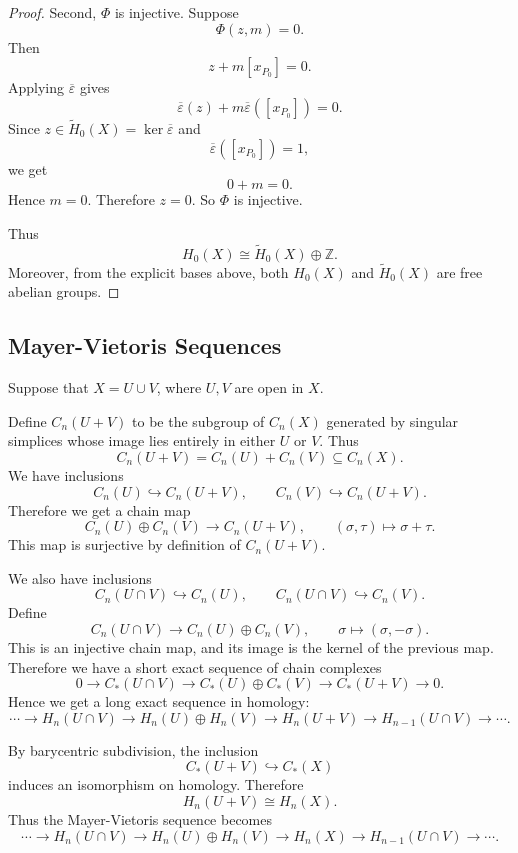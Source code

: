 \documentclass[11pt,a4paper]{article}
\theoremstyle{definition}
\theoremstyle{plain}
\theoremstyle{remark}
\newcommand{\1}{\mathbbm{1}}
\begin{document}
\begin{proof}
Second, $\Phi$ is injective. Suppose
\[
\Phi(z,m)=0.
\]
Then
\[
z+m[x_{P_0}]=0.
\]
Applying $\overline{\varepsilon}$ gives
\[
\overline{\varepsilon}(z)+m\overline{\varepsilon}([x_{P_0}])=0.
\]
Since $z\in \widetilde H_0(X)=\ker\overline{\varepsilon}$ and
\[
\overline{\varepsilon}([x_{P_0}])=1,
\]
we get
\[
0+m=0.
\]
Hence $m=0$. Therefore $z=0$. So $\Phi$ is injective.

Thus
\[
H_0(X)\cong \widetilde H_0(X)\oplus \mathbb Z.
\]
Moreover, from the explicit bases above, both $H_0(X)$ and $\widetilde H_0(X)$ are free
abelian groups.
\end{proof}

\subsection{Mayer-Vietoris Sequences}

Suppose that $X = U \cup V$, where $U,V$ are open in $X$.

Define $C_n(U+V)$ to be the subgroup of $C_n(X)$ generated by singular simplices whose image lies entirely in either $U$ or $V$. Thus
\[
    C_n(U+V)
    =
    C_n(U) + C_n(V)
    \subseteq C_n(X).
\]
We have inclusions
\[
    C_n(U) \hookrightarrow C_n(U+V),
    \qquad
    C_n(V) \hookrightarrow C_n(U+V).
\]
Therefore we get a chain map
\[
    C_n(U)\oplus C_n(V) \to C_n(U+V),
    \qquad
    (\sigma,\tau) \mapsto \sigma+\tau.
\]
This map is surjective by definition of $C_n(U+V)$.

We also have inclusions
\[
    C_n(U\cap V) \hookrightarrow C_n(U),
    \qquad
    C_n(U\cap V) \hookrightarrow C_n(V).
\]
Define
\[
    C_n(U\cap V) \to C_n(U)\oplus C_n(V),
    \qquad
    \sigma \mapsto (\sigma,-\sigma).
\]
This is an injective chain map, and its image is the kernel of the previous map. Therefore we have a short exact sequence of chain complexes
\[
    0
    \to
    C_*(U\cap V)
    \to
    C_*(U)\oplus C_*(V)
    \to
    C_*(U+V)
    \to
    0.
\]
Hence we get a long exact sequence in homology:
\[
    \cdots
    \to
    H_n(U\cap V)
    \to
    H_n(U)\oplus H_n(V)
    \to
    H_n(U+V)
    \to
    H_{n-1}(U\cap V)
    \to
    \cdots.
\]

By barycentric subdivision, the inclusion
\[
    C_*(U+V) \hookrightarrow C_*(X)
\]
induces an isomorphism on homology. Therefore
\[
    H_n(U+V) \cong H_n(X).
\]
Thus the Mayer-Vietoris sequence becomes
\[
    \cdots
    \to
    H_n(U\cap V)
    \to
    H_n(U)\oplus H_n(V)
    \to
    H_n(X)
    \to
    H_{n-1}(U\cap V)
    \to
    \cdots.
\]
\end{document}

